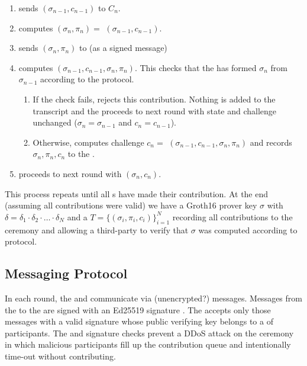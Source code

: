 \begin{enumerate}
\item \Coordinator{} sends $(\sigma_{n-1}, c_{n-1})$ to \Contributor{} $C_n$.
\item \Contributor{} computes $(\sigma_n, \pi_n) = $ \contribute{}$(\sigma_{n-1}, c_{n-1})$.
\item \Contributor{} sends $(\sigma_n, \pi_n)$ to \Coordinator{} (as a signed message)
\item \Coordinator{} computes \verify{}$(\sigma_{n-1}, c_{n-1}, \sigma_n, \pi_n)$. This checks that the \Contributor{} has formed $\sigma_n$ from $\sigma_{n-1}$ according to the protocol.
    \begin{enumerate}
        \item If the check fails, \Coordinator{} rejects this contribution. Nothing is added to the transcript and the \Coordinator{} proceeds to next round with state and challenge unchanged ($\sigma_n = \sigma_{n-1}$ and $c_n = c_{n-1}$).
        \item Otherwise, \Coordinator{} computes challenge $c_n = $ \challenge$(\sigma_{n-1}, c_{n-1}, \sigma_n, \pi_n)$ and records $\sigma_n, \pi_n, c_n$ to the \Transcript{}.
    \end{enumerate}
\item \Coordinator{} proceeds to next round with $(\sigma_n, c_n)$.
\end{enumerate}
This process repeats until all \Contributor{}s have made their contribution. At the end (assuming all contributions were valid) we have a Groth16 prover key $\sigma$ with $\delta = \delta_1 \cdot \delta_2 \cdot \ldots \cdot \delta_N $ and a \Transcript{} $T = \{ (\sigma_i, \pi_i, c_i) \}_{i=1}^N $ recording all contributions to the ceremony and allowing a third-party to verify that $\sigma$ was computed according to protocol.

\subsection{Messaging Protocol}\label{sec: MessagingProtocol}

In each round, the \Coordinator{} and \Contributor{} communicate via (unencrypted?) messages. Messages from the \Contributor{} to the \Coordinator{} are signed with an Ed25519 signature \cite{edsign}. The \Coordinator{} accepts only those messages with a valid signature whose public verifying key belongs to a \Registry{} of participants. The \Registry{} and signature checks prevent a DDoS attack on the ceremony in which malicious participants fill up the contribution queue and intentionally time-out without contributing.

